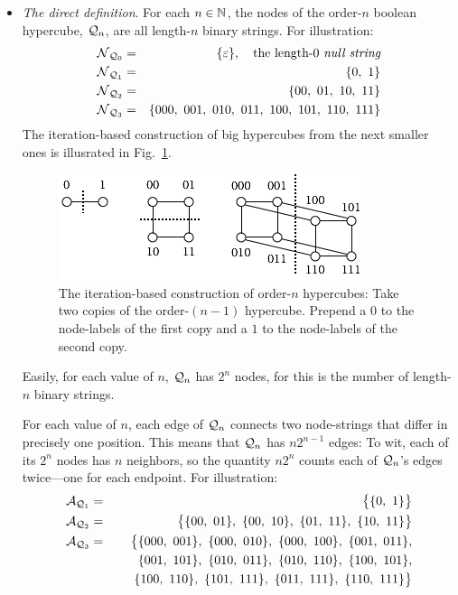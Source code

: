 \begin{itemize}
\item
{\it The direct definition}.
For each $n \in \mathbb{N}$, the nodes of the order-$n$ boolean hypercube,
$\mbox{$\cal Q$}_n$, are all length-$n$ binary strings.  For illustration:
\begin{eqnarray*}
\mbox{$\cal N$}_{{\mbox{{\scriptsize $\cal Q$}}}_0}
  & = & 
\{ \varepsilon \}, \ \ \mbox{ the length-$0$ {\em null string}} \\ 
\mbox{$\cal N$}_{{\mbox{{\scriptsize $\cal Q$}}}_1}
  & = &
\{ 0, \ 1 \} \\
\mbox{$\cal N$}_{{\mbox{{\scriptsize $\cal Q$}}}_2}
  & = & \{ 00, \ 01, \ 10, \ 11 \} \\
\mbox{$\cal N$}_{{\mbox{{\scriptsize $\cal Q$}}}_3}
  & = & \{ 000, \ 001, \ 010, \ 011, \ 100, \ 101, \ 110, \ 111 \} 
\end{eqnarray*}
The iteration-based construction of big hypercubes from the next
smaller ones is illusrated in Fig.~\ref{fig:hypercube}.
\begin{figure}[hbt]
\begin{center}
       \includegraphics[scale=0.6]{FiguresGraph/hypercube}
\caption{The iteration-based construction of order-$n$ hypercubes:
  Take two copies of the order-$(n-1)$ hypercube.  Prepend a $0$ to
  the node-labels of the first copy and a $1$ to the node-labels of
  the second copy.}
  \label{fig:hypercube}
\end{center}
\end{figure}

Easily, for each value of $n$, $\mbox{$\cal Q$}_n$ has $2^n$ nodes, for this is the
number of length-$n$ binary strings.

\medskip

For each value of $n$, each edge of $\mbox{$\cal Q$}_n$ connects two node-strings
that differ in precisely one position.  This means that $\mbox{$\cal Q$}_n$ has $n
2^{n-1}$ edges: To wit, each of its $2^n$ nodes has $n$ neighbors, so
the quantity $n 2^n$ counts each of $\mbox{$\cal Q$}_n$'s edges twice---one for
each endpoint.  For illustration:
\begin{eqnarray*}
\mbox{$\cal A$}_{{\mbox{{\scriptsize $\cal Q$}}}_1}
  & = &
\big\{ \{ 0, \ 1 \} \big\} \\
\mbox{$\cal A$}_{{\mbox{{\scriptsize $\cal Q$}}}_2}
  & = & \big\{
\{ 00, \ 01 \}, \ \{ 00, \ 10\}, \
\{ 01, \ 11 \}, \ \{ 10, \ 11\} 
\big\} \\
\mbox{$\cal A$}_{{\mbox{{\scriptsize $\cal Q$}}}_3}
  & = & \big\{ 
\{000, \ 001\}, \
\{000, \ 010\}, \
\{000, \ 100\}, \
\{001, \ 011\}, \\
  &  & \hspace*{.2in}
\{001, \ 101\}, \
\{010, \ 011\}, \
\{010, \ 110\}, \
\{100, \ 101\}, \\
  &  & \hspace*{.2in}
\{100, \ 110\}, \
\{101, \ 111\}, \
\{011, \ 111\}, \
\{110, \ 111\}
\big\}
\end{eqnarray*}
\end{itemize}

